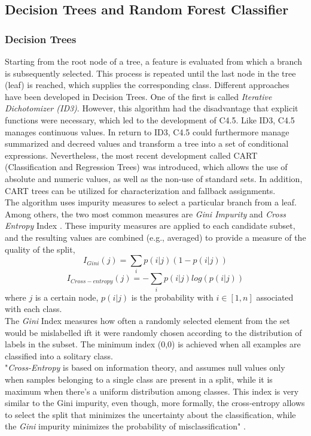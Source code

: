 \documentclass[a4paper, 11pt,titlepage,oneside,openany]{book}
\begin{document}
\subsection{Decision Trees and Random Forest Classifier}
\subsubsection{Decision Trees}
Starting from the root node of a tree, a feature is evaluated from which a branch is subsequently selected. This process is repeated until the last node in the tree (leaf) is reached, which supplies the corresponding class. Different approaches have been developed in Decision Trees. One of the first is called \textit{Iterative Dichotomizer (ID3)}. However, this algorithm had the disadvantage that explicit functions were necessary, which led to the development of C4.5. Like ID3, C4.5 manages continuous values. In return to ID3, C4.5 could furthermore manage summarized and decreed values and transform a tree into a set of conditional expressions. Nevertheless, the most recent development called CART (Classification and Regression Trees) was introduced, which allows the use of absolute and numeric values, as well as the non-use of standard sets. In addition, CART trees can be utilized for characterization and fallback assignments. \cite{algorithms2}\\
\noindent The algorithm uses impurity measures to select a particular branch from a leaf. Among others, the two most common measures are \textit{Gini Impurity} and \textit{Cross Entropy} Index \cite{algorithms}. 
\newpage
\noindent These impurity measures are  applied to each candidate subset, and the resulting values are combined (e.g., averaged) to provide a measure of the quality of the split,
\[
I_{Gini}(j)=\sum_{i}p(i|j)(1-p(i|j))
\]
\[
I_{Cross-entropy}(j)=-\sum_{i}p(i|j)log(p(i|j))
\]
where $j$ is a certain node, $p(i|j)$ is the probability with $i \in [1,n]$ associated with each class.\\
\noindent The \textit{Gini} Index measures how often a randomly selected element from the set would be mislabelled ift it were randomly chosen according to the distribution of labels in the subset. The minimum index (0,0) is achieved when all examples are classified into a solitary class.\\
\noindent "\textit{Cross-Entropy} is based on information theory, and assumes null values only when samples belonging to a single class are present in a split, while it is maximum when there's a uniform distribution among classes. This index is very similar to the Gini impurity, even though, more formally, the cross-entropy allows to select the split that minimizes the uncertainty about the classification, while the \textit{Gini} impurity minimizes the probability of misclassification" \cite{algorithms}.
\end{document}
